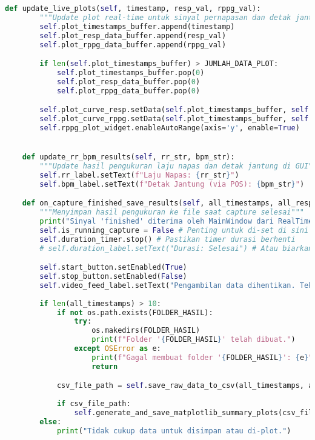 \documentclass[11pt,a4paper]{article}
\begin{document}
\begin{lstlisting}[language=Python, caption=Kelas RealTimeSignalWorker,label={labelkode}]
    def update_live_plots(self, timestamp, resp_val, rppg_val):
        """Update plot real-time untuk sinyal pernapasan dan detak jantung"""
        self.plot_timestamps_buffer.append(timestamp)
        self.plot_resp_data_buffer.append(resp_val)
        self.plot_rppg_data_buffer.append(rppg_val)

        if len(self.plot_timestamps_buffer) > JUMLAH_DATA_PLOT:
            self.plot_timestamps_buffer.pop(0)
            self.plot_resp_data_buffer.pop(0)
            self.plot_rppg_data_buffer.pop(0)

        self.plot_curve_resp.setData(self.plot_timestamps_buffer, self.plot_resp_data_buffer)
        self.plot_curve_rppg.setData(self.plot_timestamps_buffer, self.plot_rppg_data_buffer)
        self.rppg_plot_widget.enableAutoRange(axis='y', enable=True)


    def update_rr_bpm_results(self, rr_str, bpm_str):
        """Update hasil pengukuran laju napas dan detak jantung di GUI"""
        self.rr_label.setText(f"Laju Napas: {rr_str}")
        self.bpm_label.setText(f"Detak Jantung (via POS): {bpm_str}")

    def on_capture_finished_save_results(self, all_timestamps, all_respiration_data, all_rppg_rgb_data, all_live_g_minus_b_plot_data):
        """Menyimpan hasil pengukuran ke file saat capture selesai"""
        print("Sinyal 'finished' diterima oleh MainWindow dari RealTimeSignalWorker.")
        self.is_running_capture = False # Penting untuk di-set di sini
        self.duration_timer.stop() # Pastikan timer durasi berhenti
        # self.duration_label.setText("Durasi: Selesai") # Atau biarkan nilai terakhir

        self.start_button.setEnabled(True)
        self.stop_button.setEnabled(False)
        self.video_feed_label.setText("Pengambilan data dihentikan. Tekan 'Mulai' lagi.")
        
        if len(all_timestamps) > 10: 
            if not os.path.exists(FOLDER_HASIL):
                try:
                    os.makedirs(FOLDER_HASIL)
                    print(f"Folder '{FOLDER_HASIL}' telah dibuat.")
                except OSError as e:
                    print(f"Gagal membuat folder '{FOLDER_HASIL}': {e}")
                    return 

            csv_file_path = self.save_raw_data_to_csv(all_timestamps, all_respiration_data, all_rppg_rgb_data) 
            
            if csv_file_path: 
                self.generate_and_save_matplotlib_summary_plots(csv_file_path)
        else:
            print("Tidak cukup data untuk disimpan atau di-plot.")
            

\end{lstlisting}
\end{document}
